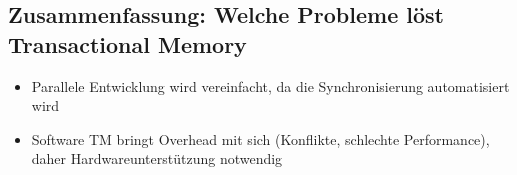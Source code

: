 \subsection{Zusammenfassung: Welche Probleme löst Transactional Memory}
\begin{itemize}
	\item Parallele Entwicklung wird vereinfacht, da die Synchronisierung automatisiert wird
	\item Software TM bringt Overhead mit sich (Konflikte, schlechte Performance), daher Hardwareunterstützung notwendig
\end{itemize}



































